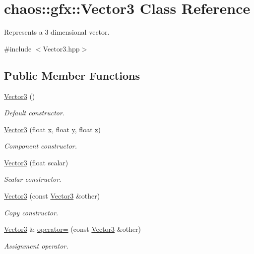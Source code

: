 \hypertarget{classchaos_1_1gfx_1_1_vector3}{}\section{chaos\+:\+:gfx\+:\+:Vector3 Class Reference}
\label{classchaos_1_1gfx_1_1_vector3}


Represents a 3 dimensional vector.  




{\ttfamily \#include $<$Vector3.\+hpp$>$}

\subsection*{Public Member Functions}
\begin{DoxyCompactItemize}
\item 
\hyperlink{classchaos_1_1gfx_1_1_vector3_a8cd3092f89afc127d6fd993e3291bd2b}{Vector3} ()
\begin{DoxyCompactList}\small\item\em Default constructor. \end{DoxyCompactList}\item 
\hyperlink{classchaos_1_1gfx_1_1_vector3_a62a4131e3f8bfbc1fc076149db944c94}{Vector3} (float \hyperlink{classchaos_1_1gfx_1_1_vector3_ac58f0d4a6e611ae3eec8e9f56476fc13}{x}, float \hyperlink{classchaos_1_1gfx_1_1_vector3_ac001a2e7468d6c6cfc5119d486817f0b}{y}, float \hyperlink{classchaos_1_1gfx_1_1_vector3_a7ec457e7ef3054557dacdc89bf7ce77b}{z})
\begin{DoxyCompactList}\small\item\em Component constructor. \end{DoxyCompactList}\item 
\hyperlink{classchaos_1_1gfx_1_1_vector3_a0ab061f754dac90c843317d979defb70}{Vector3} (float scalar)
\begin{DoxyCompactList}\small\item\em Scalar constructor. \end{DoxyCompactList}\item 
\hyperlink{classchaos_1_1gfx_1_1_vector3_a32fd7944a73e7f8d9bb6a9e6ee6d4bce}{Vector3} (const \hyperlink{classchaos_1_1gfx_1_1_vector3}{Vector3} \&other)
\begin{DoxyCompactList}\small\item\em Copy constructor. \end{DoxyCompactList}\item 
\hyperlink{classchaos_1_1gfx_1_1_vector3}{Vector3} \& \hyperlink{classchaos_1_1gfx_1_1_vector3_a3c26200a523e201ef3697797732951cb}{operator=} (const \hyperlink{classchaos_1_1gfx_1_1_vector3}{Vector3} \&other)
\begin{DoxyCompactList}\small\item\em Assignment operator. \end{DoxyCompactList}\end{DoxyCompactItemize}
